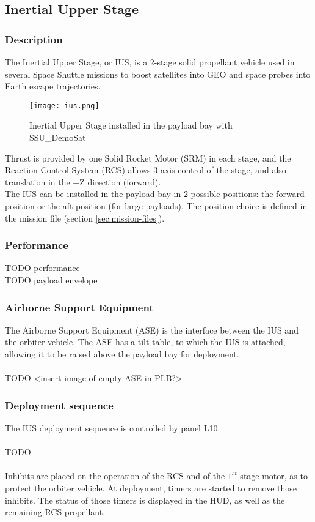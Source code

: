 \documentclass[Space_Shuttle_Ultra_Manual.tex]{subfiles}
\begin{document}
\subsection{Inertial Upper Stage}
\begin{multicols*}{2}
\renewcommand{\cfttoctitlefont}{\bf}
\localtableofcontents
\subsubsection{Description}
\noindent
The Inertial Upper Stage, or IUS, is a 2-stage solid propellant vehicle used in several Space Shuttle missions to boost satellites into GEO and space probes into Earth escape trajectories.
\\
\begin{figure}[H]
	\centering
	\captionsetup{justification=centering}
  \texttt{[image: ius.png]}
  \caption{Inertial Upper Stage installed in the payload bay with SSU\_DemoSat}
  \label{fig:ius}
\end{figure}

Thrust is provided by one Solid Rocket Motor (SRM) in each stage, and the Reaction Control System (RCS) allows 3-axis control of the stage, and also translation in the +Z direction (forward).\\
The IUS can be installed in the payload bay in 2 possible positions: the forward position or the aft position (for large payloads). The position choice is defined in the mission file (section \ref{sec:mission-files}).

\subsubsection{Performance}
TODO performance
\\
TODO payload envelope

\subsubsection{Airborne Support Equipment}
The Airborne Support Equipment (ASE) is the interface between the IUS and the orbiter vehicle. The ASE has a tilt table, to which the IUS is attached, allowing it to be raised above the payload bay for deployment.
\\
\\
TODO <insert image of empty ASE in PLB?>

\subsubsection{Deployment sequence}
The IUS deployment sequence is controlled by panel L10.
\\
\\
TODO
\\
\\
Inhibits are placed on the operation of the RCS and of the $1^{st}$ stage motor, as to protect the orbiter vehicle. At deployment, timers are started to remove those inhibits. The status of those timers is displayed in the HUD, as well as the remaining RCS propellant.


\end{multicols*}
\end{document}
